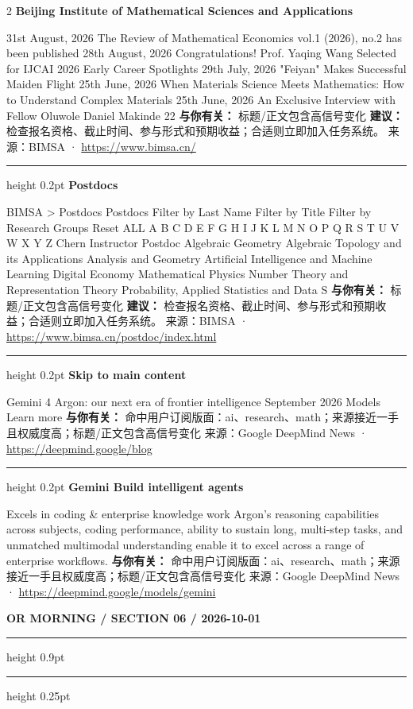\documentclass[10.5pt]{ctexart}
\begin{document}
\begin{multicols}{2}
{\large\bfseries Beijing Institute of Mathematical Sciences and Applications}\par
31st August, 2026 The Review of Mathematical Economics vol.1 (2026), no.2 has been published 28th August, 2026 Congratulations! Prof. Yaqing Wang Selected for IJCAI 2026 Early Career Spotlights 29th July, 2026 "Feiyan" Makes Successful Maiden Flight 25th June, 2026 When Materials Science Meets Mathematics: How to Understand Complex Materials 25th June, 2026 An Exclusive Interview with Fellow Oluwole Daniel Makinde 22
\textbf{与你有关：} 标题/正文包含高信号变化
\textbf{建议：} 检查报名资格、截止时间、参与形式和预期收益；合适则立即加入任务系统。
{\footnotesize\color{ormuted} 来源：BIMSA · \url{https://www.bimsa.cn/}}
\vspace{2mm}
\hrule height 0.2pt
\vspace{2mm}
{\large\bfseries Postdocs}\par
BIMSA > Postdocs Postdocs Filter by Last Name Filter by Title Filter by Research Groups Reset ALL A B C D E F G H I J K L M N O P Q R S T U V W X Y Z Chern Instructor Postdoc Algebraic Geometry Algebraic Topology and its Applications Analysis and Geometry Artificial Intelligence and Machine Learning Digital Economy Mathematical Physics Number Theory and Representation Theory Probability, Applied Statistics and Data S
\textbf{与你有关：} 标题/正文包含高信号变化
\textbf{建议：} 检查报名资格、截止时间、参与形式和预期收益；合适则立即加入任务系统。
{\footnotesize\color{ormuted} 来源：BIMSA · \url{https://www.bimsa.cn/postdoc/index.html}}
\vspace{2mm}
\hrule height 0.2pt
\vspace{2mm}
{\large\bfseries Skip to main content}\par
Gemini 4 Argon: our next era of frontier intelligence September 2026 Models Learn more
\textbf{与你有关：} 命中用户订阅版面：ai、research、math；来源接近一手且权威度高；标题/正文包含高信号变化
{\footnotesize\color{ormuted} 来源：Google DeepMind News · \url{https://deepmind.google/blog}}
\vspace{2mm}
\hrule height 0.2pt
\vspace{2mm}
{\large\bfseries Gemini Build intelligent agents}\par
Excels in coding \& enterprise knowledge work Argon’s reasoning capabilities across subjects, coding performance, ability to sustain long, multi-step tasks, and unmatched multimodal understanding enable it to excel across a range of enterprise workflows.
\textbf{与你有关：} 命中用户订阅版面：ai、research、math；来源接近一手且权威度高；标题/正文包含高信号变化
{\footnotesize\color{ormuted} 来源：Google DeepMind News · \url{https://deepmind.google/models/gemini}}
\end{multicols}
\newpage
{\small\bfseries OR MORNING / SECTION 06 / 2026-10-01}
\vspace{2mm}
\hrule height 0.9pt
\vspace{1.5mm}
\hrule height 0.25pt
\vspace{4mm}
\end{document}
